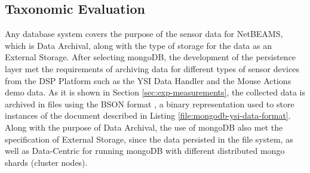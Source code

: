 \subsection{Taxonomic Evaluation}

Any database system covers the purpose of the sensor data for NetBEAMS, which
is Data Archival, along with the type of storage for the data as an External
Storage. After selecting mongoDB, the development of the persistence layer met
the requirements of archiving data for different types of sensor devices from
the DSP Platform such as the YSI Data Handler and the Mouse Actions demo data.
As it is shown in Section \ref{sec:exp-measurements}, the collected data is
archived in files using the BSON format \cite{bson}, a binary representation
used to store instances of the document described in Listing
\ref{file:mongodb-ysi-data-format}. Along with the purpose of Data Archival,
the use of mongoDB also met the specification of External Storage, since the
data persisted in the file system, as well as Data-Centric for running mongoDB
with different  distributed mongo shards (cluster nodes).

